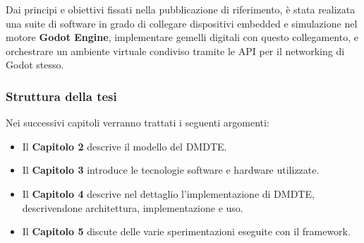 Dai principi e obiettivi fissati nella pubblicazione di riferimento, è stata realizata una suite di software in grado di collegare dispositivi embedded e simulazione nel motore \textbf{Godot Engine}, implementare gemelli digitali con questo collegamento, e orchestrare un ambiente virtuale condiviso tramite le API per il networking di Godot stesso.

\bigbreak 

 

\subsubsection*{Struttura della tesi}
Nei successivi capitoli verranno trattati i seguenti argomenti:
\begin{itemize}
  \item Il \textbf{Capitolo 2} descrive il modello del DMDTE.

  \item Il \textbf{Capitolo 3} introduce le tecnologie software e hardware utilizzate.
  \item Il \textbf{Capitolo 4} descrive nel dettaglio l'implementazione di DMDTE, descrivendone architettura, implementazione e uso.
  \item Il \textbf{Capitolo 5} discute delle varie sperimentazioni eseguite con il framework. 
\end{itemize}